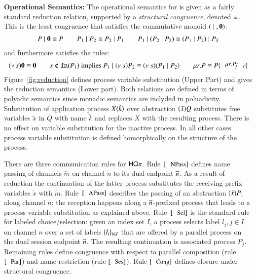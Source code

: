 {\bf Operational Semantics:}
The operational semantics for \HOp is given as a fairly standard reduction relation, supported by
a \emph{structural congruence}, denoted $\equiv$. This is 
the least congruence that satisfies the commutative monoid $(\;|\;, \mathbf{0})$:
%
\[
	\begin{array}{c}
		P \;|\; \mathbf{0} \equiv P
		\qquad
		P_1 \;|\; P_2 \equiv P_2 \;|\; P_1
		\qquad
		P_1 \;|\; (P_2 \;|\; P_3) \equiv (P_1 \;|\; P_2) \;|\; P_3
	\end{array}
\]
%
\noi and furthermore satisfies the rules:
%
\[
\begin{array}{c}
	\news{s} \inact \scong \inact
	\qquad
	s \notin \fn{P_1} \textrm{  implies  } P_1 \Par \news{s} P_2 \scong \news{s}(P_1 \Par P_2)
	\qquad
	\rec{r}{P} \scong P\subst{\rec{r}{P}}{r}
\end{array}
\]
%
\noi Figure~\ref{fig:reduction} defines
process variable substitution (Upper Part) and gives the 
reduction semantics (Lower part).
Both relations are defined in terms of polyadic semantics since
monadic semantics are inclyded in poluadicity.
Substitution of application process $X\langle \tilde{k} \rangle$
over abstraction $(\tilde{x})Q$ substitutes free variables
$\tilde{x}$ in $Q$ with name $\tilde{k}$ and replaces
$X$ with the resulting process.
There is no effect on variable substitution for the inactive process.
In all other cases process variable substitution is defined
homorphically on the structure of the process.



There are three communication rules for $\mathsf{HO}\pi$. 
Rule~$\orule{NPass}$ defines name passing 
of channels $\tilde{m}$ on channel $n$ to its dual endpoint $\overline{n}$.
As a result of reduction the continuation of the 
latter process substitutes the receiving prefix variables $\tilde{x}$
with $\tilde{m}$.
Rule~$\orule{APass}$ describes
the passing of an abstraction $(\tilde{x})P_1$
along channel $n$;
the reception happens along a $\overline{n}$-prefixed process that
leads to a process variable substitution as explained above.
Rule~$\orule{Sel}$ is the standard rule for labeled choice/selection:
given an index set $I$, 
a process selects label $l_j, j \in I$ on channel $n$ over a set of
labels $\{l_i\}_{i \in I}$ that are offered by a parallel process
on the dual session endpoint $\overline{n}$.
The resulting continuation is associated process $P_j$.
Remaining rules define congruence 
with respect to parallel composition (rule $\orule{Par}$)
and name restriction (rule $\orule{Ses}$).
Rule $\orule{Cong}$ defines closure under structural congruence.



